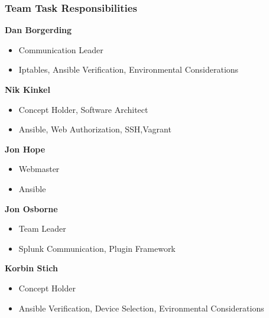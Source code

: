 \begin{frame}
\frametitle{Team Task Responsibilities}

\textbf{Dan Borgerding}
\begin{itemize}
\item Communication Leader
\item Iptables, Ansible Verification, Environmental Considerations \end{itemize}

\textbf{Nik Kinkel}
\begin{itemize}
\item Concept Holder, Software Architect
\item Ansible, Web Authorization, SSH,Vagrant \end{itemize}


\textbf{Jon Hope}
\begin{itemize}
\item Webmaster
\item Ansible
\end{itemize}

\textbf{Jon Osborne}
\begin{itemize}
\item Team Leader
\item Splunk Communication, Plugin Framework
\end{itemize}

\textbf{Korbin Stich}
\begin{itemize}
\item Concept Holder
\item  Ansible Verification, Device Selection, Evironmental Considerations
\end{itemize}



\end{frame}


